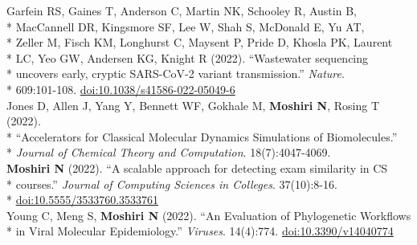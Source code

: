 \documentclass[margin,line]{res}
\begin{document}
\begin{resume}
\hspace*{9.5mm} Garfein RS, Gaines T, Anderson C, Martin NK, Schooley R, Austin B,\\*
\hspace*{9.5mm} MacCannell DR, Kingsmore SF, Lee W, Shah S, McDonald E, Yu AT,\\*
\hspace*{9.5mm} Zeller M, Fisch KM, Longhurst C, Maysent P, Pride D, Khosla PK, Laurent\\*
\hspace*{9.5mm} LC, Yeo GW, Andersen KG, Knight R (2022). ``Wastewater sequencing\\*
\hspace*{9.5mm} uncovers early, cryptic SARS-CoV-2 variant transmission.'' \textit{Nature}.\\*\vspace{2mm}
\hspace*{8mm} 609:101-108. \href{https://doi.org/10.1038/s41586-022-05049-6}{doi:10.1038/s41586-022-05049-6}\\
\hspace*{4mm} Jones D, Allen J, Yang Y, Bennett WF, Gokhale M, \textbf{Moshiri N}, Rosing T (2022).\\*
\hspace*{9.5mm} ``Accelerators for Classical Molecular Dynamics Simulations of Biomolecules.''\\*\vspace{2mm}
\hspace*{8mm} \textit{Journal of Chemical Theory and Computation}. 18(7):4047-4069.\\
\hspace*{4mm} \textbf{Moshiri N} (2022). ``A scalable approach for detecting exam similarity in CS\\*
\hspace*{9.5mm} courses.'' \textit{Journal of Computing Sciences in Colleges}. 37(10):8-16.\\*\vspace{2mm}
\hspace*{8mm} \href{https://dl.acm.org/doi/abs/10.5555/3533760.3533761}{doi:10.5555/3533760.3533761}\\
\hspace*{4mm} Young C, Meng S, \textbf{Moshiri N} (2022). ``An Evaluation of Phylogenetic Workflows\\*\vspace{2mm}
\hspace*{8mm} in Viral Molecular Epidemiology.'' \textit{Viruses}. 14(4):774. \href{https://doi.org/10.3390/v14040774}{doi:10.3390/v14040774}\\

\end{resume}
\end{document}
